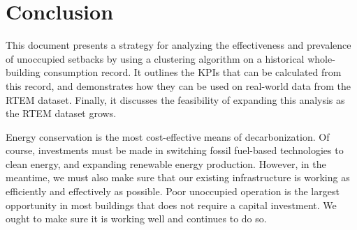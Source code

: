 \documentclass[a4paper]{article}
\begin{document}
\section{Conclusion}

This document presents a strategy for analyzing the effectiveness and prevalence of unoccupied setbacks by using a clustering algorithm on a historical whole-building consumption record. It outlines the KPIs that can be calculated from this record, and demonstrates how they can be used on real-world data from the RTEM dataset. Finally, it discusses the feasibility of expanding this analysis as the RTEM dataset grows.


Energy conservation is the most cost-effective means of decarbonization. Of course, investments must be made in switching fossil fuel-based technologies to clean energy, and expanding renewable energy production. However, in the meantime, we must also make sure that our existing infrastructure is working as efficiently and effectively as possible. Poor unoccupied operation is the largest opportunity in most buildings that does not require a capital investment. We ought to make sure it is working well and continues to do so.
\end{document}
